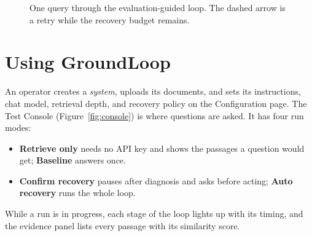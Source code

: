 \documentclass[12pt, a4paper, oneside]{report}
\begin{document}
\begin{figure}[htbp]
\centering
{}
\caption{One query through the evaluation-guided loop. The dashed arrow is
a retry while the recovery budget remains.}
\label{fig:loop}
\end{figure}

\section{Using GroundLoop}

An operator creates a \emph{system}, uploads its documents, and sets its
instructions, chat model, retrieval depth, and recovery policy on the
Configuration page. The Test Console (Figure~\ref{fig:console}) is where
questions are asked. It has four run modes:
\begin{itemize}
\item \textbf{Retrieve only} needs no API key and shows the passages a
  question would get; \textbf{Baseline} answers once.
\item \textbf{Confirm recovery} pauses after diagnosis and asks before
  acting; \textbf{Auto recovery} runs the whole loop.
\end{itemize}
While a run is in progress, each stage of the loop lights up with its timing,
and the evidence panel lists every passage with its similarity score.
\end{document}
